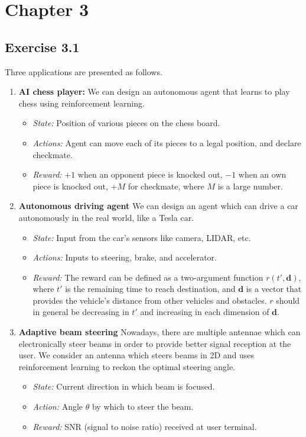 \documentclass[10pt]{article}
\begin{document}
	\section{Chapter 3}
	\subsection*{Exercise 3.1}
	\label{ss:3.1}
	Three applications are presented as follows.
	\begin{enumerate}
		\item \textbf{AI chess player:} We can design an autonomous agent that learns to play chess using reinforcement learning.
		\begin{itemize}
			\item \emph{State:} Position of various pieces on the chess board.
			\item \emph{Actions:} Agent can move each of its pieces to a legal position, and declare checkmate.
			\item \emph{Reward:} $+1$ when an opponent piece is knocked out, $-1$ when an own piece is knocked out, $+M$ for checkmate, where $M$ is a large number.
		\end{itemize}
		\item \textbf{Autonomous driving agent} We can design an agent which can drive a car autonomously in the real world, like a Tesla car.
		\begin{itemize}
			\item \emph{State:} Input from the car's sensors like camera, LIDAR, etc.
			\item \emph{Actions:} Inputs to steering, brake, and accelerator.
			\item \emph{Reward:} The reward can be defined as a two-argument function $r(t',\mathbf{d})$, where $t'$ is the remaining time to reach destination, and $\mathbf{d}$ is a vector that provides the vehicle's distance from other vehicles and obstacles. $r$ should in general be decreasing in $t'$ and increasing in each dimension of $\mathbf{d}$.
		\end{itemize}
		\item \textbf{Adaptive beam steering} Nowadays, there are multiple antennae which can electronically steer beams in order to provide better signal reception at the user. We consider an antenna which steers beams in 2D and uses reinforcement learning to reckon the optimal steering angle.
		\begin{itemize}
			\item \emph{State:} Current direction in which beam is focused.
			\item \emph{Action:} Angle $\theta$ by which to steer the beam.
			\item \emph{Reward:} SNR (signal to noise ratio) received at user terminal.
		\end{itemize}
	\end{enumerate}
\end{document}
